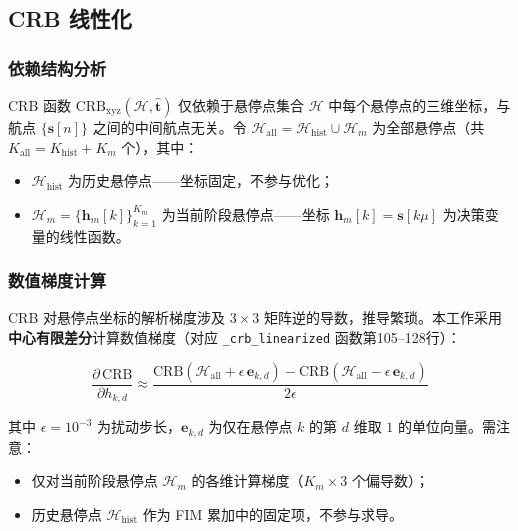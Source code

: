 \subsection{CRB 线性化}
\label{sec:crb_linear}

\subsubsection{依赖结构分析}

CRB 函数 $\mathrm{CRB}_{\mathrm{xyz}}(\mathcal{H},\hat{\mathbf{t}})$ 仅依赖于悬停点集合 $\mathcal{H}$ 中每个悬停点的三维坐标，与航点 $\{\mathbf{s}[n]\}$ 之间的中间航点无关。令 $\mathcal{H}_{\mathrm{all}}=\mathcal{H}_{\mathrm{hist}}\cup\mathcal{H}_m$ 为全部悬停点（共 $K_{\mathrm{all}}=K_{\mathrm{hist}}+K_m$ 个），其中：

\begin{itemize}
    \item $\mathcal{H}_{\mathrm{hist}}$ 为历史悬停点——坐标固定，不参与优化；
    \item $\mathcal{H}_m=\{\mathbf{h}_m[k]\}_{k=1}^{K_m}$ 为当前阶段悬停点——坐标 $\mathbf{h}_m[k]=\mathbf{s}[k\mu]$ 为决策变量的线性函数。
\end{itemize}

\subsubsection{数值梯度计算}

CRB 对悬停点坐标的解析梯度涉及 $3\times 3$ 矩阵逆的导数，推导繁琐。本工作采用\textbf{中心有限差分}计算数值梯度（对应 \texttt{\_crb\_linearized} 函数第105--128行）：

\begin{equation}
\frac{\partial\,\mathrm{CRB}}{\partial h_{k,d}}\approx
\frac{\mathrm{CRB}(\mathcal{H}_{\mathrm{all}}+\epsilon\,\mathbf{e}_{k,d})-
\mathrm{CRB}(\mathcal{H}_{\mathrm{all}}-\epsilon\,\mathbf{e}_{k,d})}{2\epsilon}
\label{eq:crb_finite_diff}
\end{equation}

其中 $\epsilon=10^{-3}$ 为扰动步长，$\mathbf{e}_{k,d}$ 为仅在悬停点 $k$ 的第 $d$ 维取 $1$ 的单位向量。需注意：

\begin{itemize}
    \item 仅对当前阶段悬停点 $\mathcal{H}_m$ 的各维计算梯度（$K_m\times 3$ 个偏导数）；
    \item 历史悬停点 $\mathcal{H}_{\mathrm{hist}}$ 作为 FIM 累加中的固定项，不参与求导。
\end{itemize}

